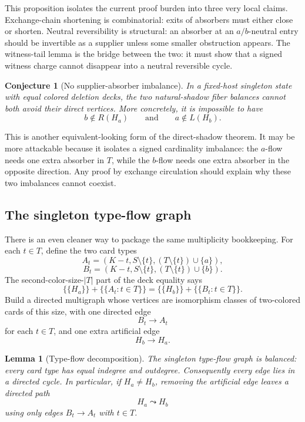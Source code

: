 \documentclass[11pt]{article}
\newtheorem{lemma}{Lemma}
\newtheorem{conjecture}{Conjecture}
\begin{document}
This proposition isolates the current proof burden into three very local
claims.  Exchange-chain shortening is combinatorial: exits of absorbers must
either close or shorten.  Neutral reversibility is structural: an absorber at
an \(a/b\)-neutral entry should be invertible as a supplier unless some
smaller obstruction appears.  The witness-tail lemma is the bridge between
the two: it must show that a signed witness charge cannot disappear into a
neutral reversible cycle.

\begin{conjecture}[No supplier-absorber imbalance]
In a fixed-host singleton state with equal colored deletion decks, the two
natural-shadow fiber balances cannot both avoid their direct vertices.  More
concretely, it is impossible to have
\[
  b\notin R(H_a)
  \qquad\text{and}\qquad
  a\notin L(H_b).
\]
\end{conjecture}

This is another equivalent-looking form of the direct-shadow theorem.  It may
be more attackable because it isolates a signed cardinality imbalance:
the \(a\)-flow needs one extra absorber in \(T\), while the \(b\)-flow needs
one extra absorber in the opposite direction.  Any proof by exchange
circulation should explain why these two imbalances cannot coexist.

\subsection{The singleton type-flow graph}

There is an even cleaner way to package the same multiplicity bookkeeping.
For each \(t\in T\), define the two card types
\[
  A_t=(K-t,S\setminus\{t\},(T\setminus\{t\})\cup\{a\}),
\]
\[
  B_t=(K-t,S\setminus\{t\},(T\setminus\{t\})\cup\{b\}).
\]
The second-color-size-\(|T|\) part of the deck equality says
\[
  \{\!\{H_a\}\!\}+\{\!\{A_t:t\in T\}\!\}
  =
  \{\!\{H_b\}\!\}+\{\!\{B_t:t\in T\}\!\}.
\]
Build a directed multigraph whose vertices are isomorphism classes of
two-colored cards of this size, with one directed edge
\[
  B_t\longrightarrow A_t
\]
for each \(t\in T\), and one extra artificial edge
\[
  H_b\longrightarrow H_a.
\]

\begin{lemma}[Type-flow decomposition]
The singleton type-flow graph is balanced: every card type has equal indegree
and outdegree.  Consequently every edge lies in a directed cycle.  In
particular, if \(H_a\neq H_b\), removing the artificial edge leaves a directed
path
\[
  H_a\leadsto H_b
\]
using only edges \(B_t\to A_t\) with \(t\in T\).
\end{lemma}
\end{document}
